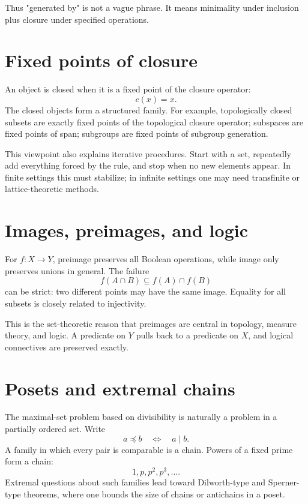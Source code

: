 Thus "generated by" is not a vague phrase.  It means minimality under inclusion plus closure under specified operations.

\section{Fixed points of closure}

An object is closed when it is a fixed point of the closure operator:
\[
  c(x)=x.
\]
The closed objects form a structured family.  For example, topologically closed subsets are exactly fixed points of the topological closure operator; subspaces are fixed points of span; subgroups are fixed points of subgroup generation.

This viewpoint also explains iterative procedures.  Start with a set, repeatedly add everything forced by the rule, and stop when no new elements appear.  In finite settings this must stabilize; in infinite settings one may need transfinite or lattice-theoretic methods.

\section{Images, preimages, and logic}

For \(f:X\to Y\), preimage preserves all Boolean operations, while image only preserves unions in general.  The failure
\[
  f(A\cap B)\subseteq f(A)\cap f(B)
\]
can be strict: two different points may have the same image.  Equality for all subsets is closely related to injectivity.

This is the set-theoretic reason that preimages are central in topology, measure theory, and logic.  A predicate on \(Y\) pulls back to a predicate on \(X\), and logical connectives are preserved exactly.

\section{Posets and extremal chains}

The maximal-set problem based on divisibility is naturally a problem in a partially ordered set.  Write
\[
  a\preceq b\quad\Longleftrightarrow\quad a\mid b.
\]
A family in which every pair is comparable is a chain.  Powers of a fixed prime form a chain:
\[
  1,p,p^2,p^3,\ldots.
\]
Extremal questions about such families lead toward Dilworth-type and Sperner-type theorems, where one bounds the size of chains or antichains in a poset.

